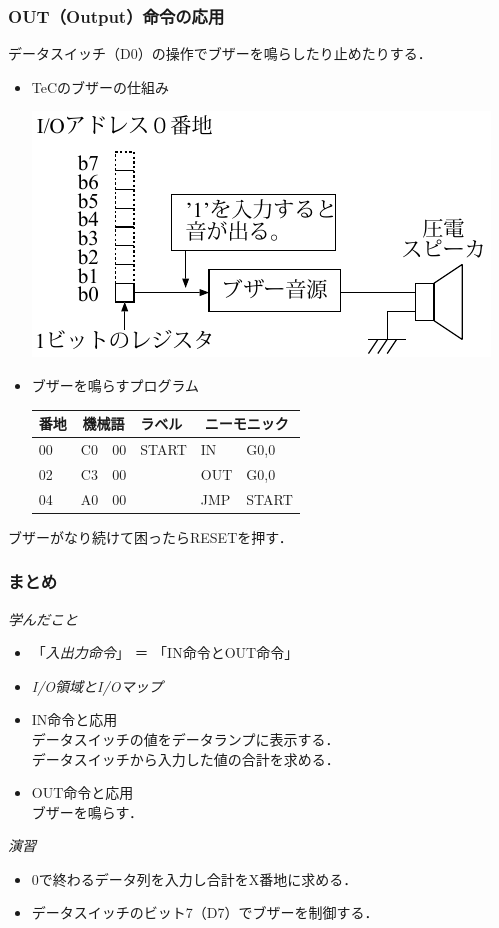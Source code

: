 \documentclass{beamer}                 %
\begin{document}
\begin{frame}
  \frametitle{OUT（Output）命令の応用}
  データスイッチ（D0）の操作でブザーを鳴らしたり止めたりする．
  \vfill
  \begin{itemize}
  \item TeCのブザーの仕組み \\
    \vfill
    \centerline{\includegraphics[scale=0.75]{../chap5/buz1.pdf}}
    \vfill
  \item ブザーを鳴らすプログラム \\
    \vfill
    {\ttfamily\footnotesize
      \begin{tabular}{|l| l l |l|l l|}
        \hline
        番地 & \multicolumn{2}{|c|}{機械語} & 
        ラベル & \multicolumn{2}{|c|}{ニーモニック} \\
        \hline
        00 & C0 & 00 & START & IN   & G0,0    \\
        02 & C3 & 00 &       & OUT  & G0,0   \\
        04 & A0 & 00 &       & JMP  & START   \\
        \hline
      \end{tabular}
    }
  \end{itemize}
  \vfill
  ブザーがなり続けて困ったらRESETを押す．
  \vfill
\end{frame}

\begin{frame}
  \frametitle{まとめ}
  \emph{学んだこと}
  \begin{itemize}
  \item 「\emph{入出力命令}」 ＝ 「IN命令とOUT命令」
  \item \emph{I/O領域とI/Oマップ}
  \item IN命令と応用 \\
    データスイッチの値をデータランプに表示する．\\
    データスイッチから入力した値の合計を求める．\\
  \item OUT命令と応用 \\
    ブザーを鳴らす．\\
  \end{itemize}
  \vfill
  \emph{演習}
  \begin{itemize}
  \item 0で終わるデータ列を入力し合計をX番地に求める．
  \item データスイッチのビット7（D7）でブザーを制御する．
  \end{itemize}
  \vfill
\end{frame}
\end{document}
